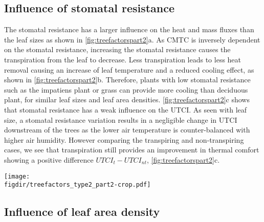 \subsection{Influence of stomatal resistance}

The stomatal resistance has a larger influence on the heat and mass fluxes than the leaf sizes as shown in \cref{fig:treefactorspart2}a. As CMTC is inversely dependent on the stomatal resistance, increasing the stomatal resistance causes the transpiration from the leaf to decrease. Less transpiration leads to less heat removal causing an increase of leaf temperature and a reduced cooling effect, as shown in \cref{fig:treefactorspart2}b. Therefore, plants with low stomatal resistance such as the impatiens plant or grass can provide more cooling than deciduous plant, for similar leaf sizes and leaf area densities. \cref{fig:treefactorspart2}c shows that stomatal resistance has a weak influence on the UTCI. As seen with leaf size, a stomatal resistance variation results in a negligible change in UTCI downstream of the trees as the lower air temperature is counter-balanced with higher air humidity. However comparing the transpiring and non-transpiring cases, we see that transpiration still provides an improvement in thermal comfort showing a positive difference $\textit{UTCI}_t-\textit{UTCI}_{\textit{nt}}$, \cref{fig:treefactorspart2}c.

	\begin{sidewaysfigure}[p]
		\centering
		\texttt{[image: \\figdir/treefactors\_type2\_part2-crop.pdf]}
		\caption{Influence of stomatal resistance $r_{\textit{s,min}}$ (s\,m$^{-1}$) on  the net energy balance of radiation, sensible and latent heat fluxes at the trees, $\int a \cdot (q_{\textit{rad,leaf}}-q_{\textit{sen,leaf}}-q_{\textit{lat,leaf}})\ dA = 0$ W\,m$^{-1}$,  on air temperature $T-T_0$ ($^{\circ}$C), and  $\textit{UTCI}$ ($^{\circ}$C). Point measurement of air temperature and $UTCI$ at three locations as shown in \cref{fig:domain}: \textit{upstream} ({\color{flatuidarkred}\textbf{red}}), \textit{downstream} ({\color{flatuidarkblue}\textbf{blue}}) and \textit{shaded} (\textbf{black}) for transpiring (T) (solid, ---) and non-transpiring (NT) conditions (dashed, - - -).}
		\label{fig:treefactorspart2}
	\end{sidewaysfigure}

\subsection{Influence of leaf area density}

